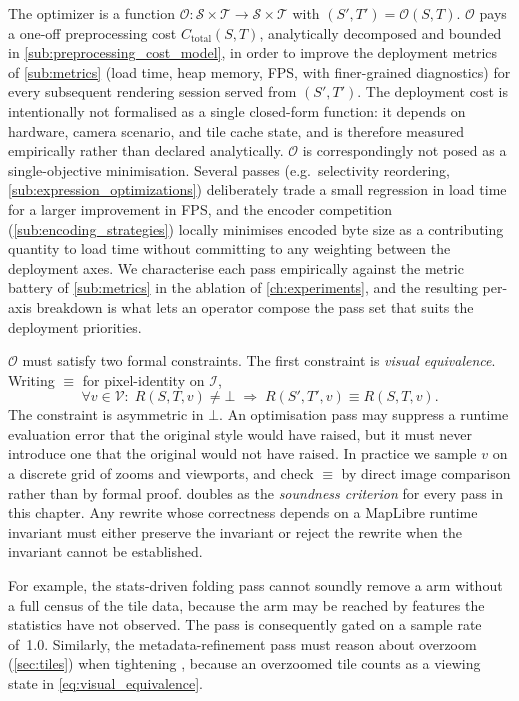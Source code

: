 The optimizer is a function $\mathcal{O}: \mathcal{S} \times \mathcal{T} \to \mathcal{S} \times \mathcal{T}$ with $(S', T') = \mathcal{O}(S, T)$.
$\mathcal{O}$ pays a one-off preprocessing cost $C_\text{total}(S, T)$, analytically decomposed and bounded in \cref{sub:preprocessing_cost_model}, in order to improve the deployment metrics of \cref{sub:metrics} (load time, heap memory, FPS, with finer-grained diagnostics) for every subsequent rendering session served from $(S', T')$.
The deployment cost is intentionally not formalised as a single closed-form function: it depends on hardware, camera scenario, and tile cache state, and is therefore measured empirically rather than declared analytically.
$\mathcal{O}$ is correspondingly not posed as a single-objective minimisation.
Several passes (e.g.\ selectivity reordering, \cref{sub:expression_optimizations}) deliberately trade a small regression in load time for a larger improvement in FPS, and the encoder competition (\cref{sub:encoding_strategies}) locally minimises encoded byte size as a contributing quantity to load time without committing to any weighting between the deployment axes.
We characterise each pass empirically against the metric battery of \cref{sub:metrics} in the ablation of \cref{ch:experiments}, and the resulting per-axis breakdown is what lets an operator compose the pass set that suits the deployment priorities.

$\mathcal{O}$ must satisfy two formal constraints.
The first constraint is \emph{visual equivalence}.
Writing $\equiv$ for pixel-identity on $\mathcal{I}$,
\begin{equation}\label{eq:visual_equivalence}
    \forall v \in \mathcal{V}:\; R(S, T, v) \neq \bot \;\Rightarrow\; R(S', T', v) \equiv R(S, T, v).
\end{equation}
The constraint is asymmetric in $\bot$.
An optimisation pass may suppress a runtime evaluation error that the original style would have raised, but it must never introduce one that the original would not have raised.
In practice we sample $v$ on a discrete grid of zooms and viewports, and check $\equiv$ by direct image comparison rather than by formal proof.
 doubles as the \emph{soundness criterion} for every pass in this chapter.
Any rewrite whose correctness depends on a MapLibre runtime invariant must either preserve the invariant or reject the rewrite when the invariant cannot be established.

For example, the stats-driven folding pass cannot soundly remove a  arm without a full census of the tile data, because the arm may be reached by features the statistics have not observed.
The pass is consequently gated on a sample rate of~1.0.
Similarly, the metadata-refinement pass must reason about overzoom (\cref{sec:tiles}) when tightening , because an overzoomed tile counts as a viewing state in \cref{eq:visual_equivalence}.


